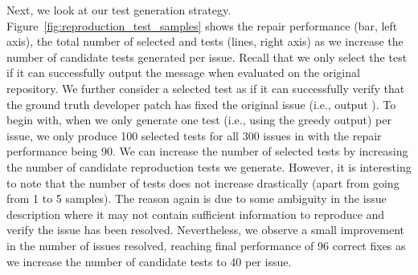 Next, we look at our \reproduction test generation strategy. 
Figure~\ref{fig:reproduction_test_samples} shows the repair performance (bar, left axis), the total number of selected and \plausiblecorrect \reproduction tests (lines, right axis) as we increase the number of candidate \reproduction tests generated per issue. 
Recall that we only select the \reproduction test if it can successfully output the  message when evaluated on the original repository.
We further consider a selected \reproduction test as \plausiblecorrect if it can successfully verify that the ground truth developer patch has fixed the original issue (i.e., output ).
To begin with, when we only generate one \reproduction test (i.e., using the greedy output) per issue, we only produce 100 selected tests for all 300 issues in \swebenchlite with the repair performance being 90. 
We can increase the number of selected \reproduction tests by increasing the number of candidate reproduction tests we generate. 
However, it is interesting to note that the number of \plausiblecorrect \reproduction tests does not increase drastically (apart from going from 1 to 5 samples). 
The reason again is due to some ambiguity in the issue description where it may not contain sufficient information to reproduce and verify the issue has been resolved.
Nevertheless, we observe a small improvement in the number of issues resolved, reaching final performance of 96 correct fixes as we increase the number of candidate \reproduction tests to 40 per issue. 
